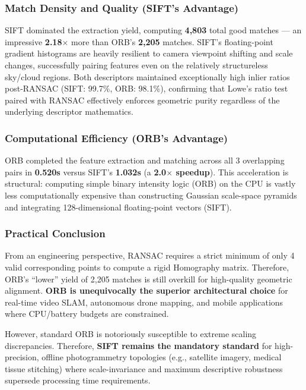 \documentclass[a4paper,12pt]{article}
\begin{document}
\subsubsection{Match Density and Quality (SIFT's Advantage)}

SIFT dominated the extraction yield, computing \textbf{4,803} total good matches --- an impressive \textbf{2.18$\times$} more than ORB's \textbf{2,205} matches. SIFT's floating-point gradient histograms are heavily resilient to camera viewpoint shifting and scale changes, successfully pairing features even on the relatively structureless sky/cloud regions. Both descriptors maintained exceptionally high inlier ratios post-RANSAC (SIFT: 99.7\%, ORB: 98.1\%), confirming that Lowe's ratio test paired with RANSAC effectively enforces geometric purity regardless of the underlying descriptor mathematics.

\subsubsection{Computational Efficiency (ORB's Advantage)}

ORB completed the feature extraction and matching across all 3 overlapping pairs in \textbf{0.520s} versus SIFT's \textbf{1.032s} (a \textbf{2.0$\times$ speedup}). This acceleration is structural: computing simple binary intensity logic (ORB) on the CPU is vastly less computationally expensive than constructing Gaussian scale-space pyramids and integrating 128-dimensional floating-point vectors (SIFT).

\subsubsection{Practical Conclusion}

From an engineering perspective, RANSAC requires a strict minimum of only 4 valid corresponding points to compute a rigid Homography matrix. Therefore, ORB's ``lower'' yield of 2,205 matches is still overkill for high-quality geometric alignment. \textbf{ORB is unequivocally the superior architectural choice} for real-time video SLAM, autonomous drone mapping, and mobile applications where CPU/battery budgets are constrained.

However, standard ORB is notoriously susceptible to extreme scaling discrepancies. Therefore, \textbf{SIFT remains the mandatory standard} for high-precision, offline photogrammetry topologies (e.g., satellite imagery, medical tissue stitching) where scale-invariance and maximum descriptive robustness supersede processing time requirements.
\end{document}
